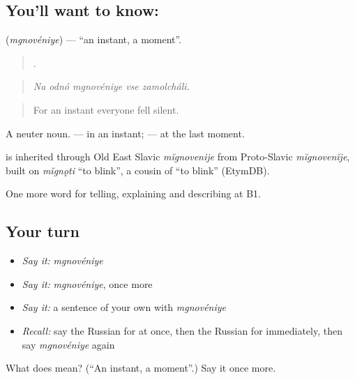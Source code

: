 \subsection*{You'll want to know: }
\textbf{} (\emph{mgnovéniye}) — \textquotedblleft{}an instant, a moment\textquotedblright{}.

\begin{quote}
    .
\end{quote}

\begin{quote}
\emph{Na odnó mgnovéniye vse zamolcháli.}
\end{quote}

\begin{quote}
For an instant everyone fell silent.
\end{quote}

A neuter noun. \emph{  } — in an instant; \emph{  } — at the last moment.

\begin{cousinweb}
\emph{} is inherited through Old East Slavic \emph{mĭgnovenije} from Proto-Slavic \emph{mĭgnovenĭje}, built on \emph{mĭgnǫti} \textquotedblleft{}to blink\textquotedblright{}, a cousin of \emph{} \textquotedblleft{}to blink\textquotedblright{} (EtymDB).
\end{cousinweb}

\begin{grammarlens}[title={What you've built}]
One more word for telling, explaining and describing at B1.
\end{grammarlens}

\subsection*{Your turn}
\begin{itemize}
\raggedright
  \item \emph{Say it:} \emph{mgnovéniye}
  \item \emph{Say it:} \emph{mgnovéniye}, once more
  \item \emph{Say it:} a sentence of your own with \emph{mgnovéniye}
  \item \emph{Recall:} say the Russian for at once, then the Russian for immediately, then say \emph{mgnovéniye} again
\end{itemize}

\begin{tcolorbox}[breakable,colback=teal!4,colframe=teal!35!black,title={Before you move on}]
What does  mean? (\textquotedblleft{}An instant, a moment\textquotedblright{}.) Say it once more.
\end{tcolorbox}
